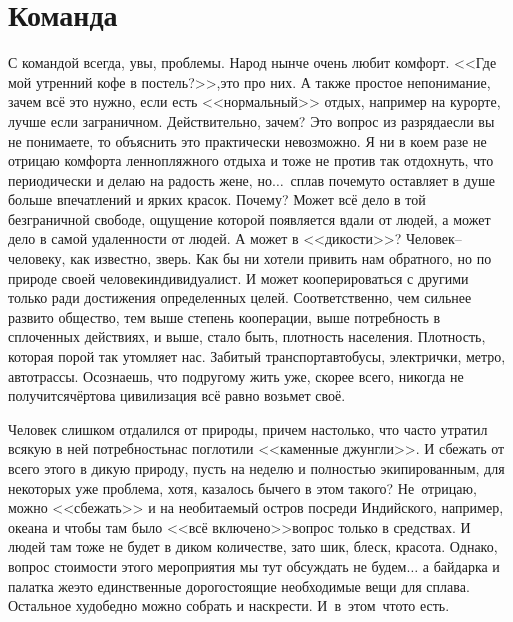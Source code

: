 \chapter{Команда} 

С командой всегда, увы, проблемы. Народ нынче очень любит комфорт. <<Где мой утренний кофе в постель?>>,\mdash это про них. А также простое непонимание, зачем всё это нужно, если есть <<нормальный>> отдых, например на курорте, лучше если заграничном. Действительно, зачем? Это вопрос из разряда\mdash если вы не понимаете, то объяснить это практически невозможно. Я ни в коем разе не отрицаю комфорта ленно\sdash пляжного отдыха и тоже не против так отдохнуть, что периодически и делаю на радость жене, но$\ldots$~сплав почему\sdash то оставляет в душе больше впечатлений и ярких красок. Почему? Может всё дело в той безграничной свободе, ощущение которой появляется вдали от людей, а может дело в самой удаленности от людей. А может в <<дикости>>? Человек\thinspace--\thinspace человеку, как известно, зверь. Как бы ни хотели привить нам обратного, но по природе своей человек\mdash индивидуалист. И может кооперироваться с другими только ради достижения определенных целей. Соответственно, чем сильнее развито общество, тем выше степень кооперации, выше потребность в сплоченных действиях, и выше, стало быть, плотность населения. Плотность, которая порой так утомляет нас. Забитый транспорт\mdash автобусы, электрички, метро, автотрассы. Осознаешь, что по\sdash другому жить уже, скорее всего, никогда не получится\mdash чёртова цивилизация всё равно возьмет своё. ­

Человек слишком отдалился от природы, причем настолько, что часто утратил всякую в ней потребность\mdash нас поглотили <<каменные джунгли>>. И сбежать от всего этого в дикую природу, пусть на неделю и полностью экипированным, для некоторых уже проблема, хотя, казалось бы\mdash чего в этом такого? Не~отрицаю, можно <<сбежать>> и на необитаемый остров посреди Индийского, например, океана и чтобы там было <<всё включено>>\mdash вопрос только в средствах. И людей там тоже не будет в диком количестве, зато шик, блеск, красота. Однако, вопрос стоимости этого мероприятия мы тут обсуждать не будем$\ldots$ а байдарка и палатка же\mdash это единственные дорогостоящие необходимые вещи для сплава. Остальное худо\sdash бедно можно собрать и наскрести. И~в~этом~что\sdash то есть. 

